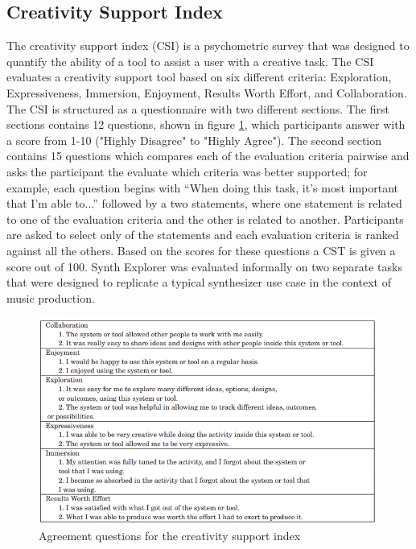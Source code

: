 \subsection{Creativity Support Index}
The creativity support index (CSI) \cite{cherry2014quantifying} is a psychometric survey that was designed to quantify the ability of a tool to assist a user with a creative task. The CSI evaluates a creativity support tool based on six different criteria: Exploration, Expressiveness, Immersion, Enjoyment, Results Worth Effort, and Collaboration. The CSI is structured as a questionnaire with two different sections. The first sections contains 12 questions, shown in figure \ref{fig:csi}, which participants answer with a score from 1-10 ("Highly Disagree" to "Highly Agree"). The second section contains 15 questions which compares each of the evaluation criteria pairwise and asks the participant the evaluate which criteria was better supported; for example, each question begins with “When doing this task, it’s most important that I’m able to...” followed by a two statements, where one statement is related to one of the evaluation criteria and the other is related to another. Participants are asked to select only of the statements and each evaluation criteria is ranked against all the others. Based on the scores for these questions a CST is given a score out of 100. Synth Explorer was evaluated informally on two separate tasks that were designed to replicate a typical synthesizer use case in the context of music production.

\begin{figure}[ht]
    \centering
    \includegraphics[width=0.99\textwidth]{figures/synthexplore/CSI-Questions.png}
    \caption{Agreement questions for the creativity support index}
    \label{fig:csi}
\end{figure}

